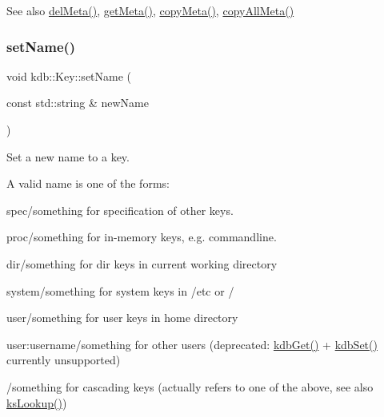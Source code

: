\begin{DoxySeeAlso}{See also}
\hyperlink{classkdb_1_1Key_a2305da805095605aca38d53f2733fb57}{del\+Meta()}, \hyperlink{classkdb_1_1Key_acdd4e81b0565756c99826bf926fd6fe4}{get\+Meta()}, \hyperlink{classkdb_1_1Key_a53f6d2196a7f17c4bdc544207bdc5f4c}{copy\+Meta()}, \hyperlink{classkdb_1_1Key_aec0910bf293db33deac6a3f81359cb48}{copy\+All\+Meta()} 
\end{DoxySeeAlso}
\mbox{\label{classkdb_1_1Key_aac3b5d3a854d02187484bfbdbdf975af}} 
\subsubsection{\texorpdfstring{set\+Name()}{setName()}}
{\footnotesize\ttfamily void kdb\+::\+Key\+::set\+Name (\begin{DoxyParamCaption}\item[{const std\+::string \&}]{new\+Name }\end{DoxyParamCaption})\hspace{0.3cm}{\ttfamily [inline]}}



Set a new name to a key. 

A valid name is one of the forms\+:
\begin{DoxyItemize}
\item {\ttfamily spec/something} for specification of other keys.
\item {\ttfamily proc/something} for in-\/memory keys, e.\+g. commandline.
\item {\ttfamily dir/something} for dir keys in current working directory
\item {\ttfamily system/something} for system keys in /etc or /
\item {\ttfamily user/something} for user keys in home directory
\item {\ttfamily user\+:username/something} for other users (deprecated\+: \hyperlink{group__kdb_ga28e385fd9cb7ccfe0b2f1ed2f62453a1}{kdb\+Get()} + \hyperlink{group__kdb_ga11436b058408f83d303ca5e996832bcf}{kdb\+Set()} currently unsupported)
\item {\ttfamily /something} for cascading keys (actually refers to one of the above, see also \hyperlink{group__keyset_gaa34fc43a081e6b01e4120daa6c112004}{ks\+Lookup()})
\end{DoxyItemize}

